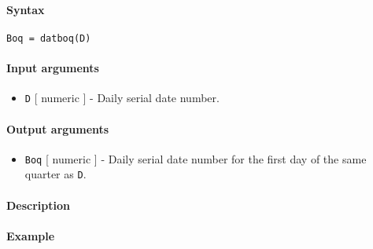 


	\paragraph{Syntax}

\begin{verbatim}
Boq = datboq(D)
\end{verbatim}

\paragraph{Input arguments}

\begin{itemize}
\itemsep1pt\parskip0pt
\item
  \texttt{D} {[} numeric {]} - Daily serial date number.
\end{itemize}

\paragraph{Output arguments}

\begin{itemize}
\itemsep1pt\parskip0pt
\item
  \texttt{Boq} {[} numeric {]} - Daily serial date number for the first
  day of the same quarter as \texttt{D}.
\end{itemize}

\paragraph{Description}

\paragraph{Example}


